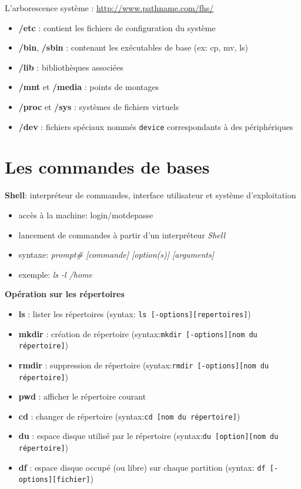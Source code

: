 \documentclass[french]{beamer}
\begin{document}
 \begin{frame}
 L'arborescence système : \url{http://www.pathname.com/fhs/}
	\begin{itemize}
	\item \textbf{/etc} : contient les fichiers de configuration du système
	\item \textbf{/bin}, \textbf{/sbin} : contenant les exécutables de base (ex: cp, mv, ls)
    \item \textbf{/lib} : bibliothèques associées 
    \item \textbf{/mnt} et \textbf{/media} : points de montages       
    \item \textbf{/proc} et \textbf{/sys} : systèmes de fichiers virtuels
    \item \textbf{/dev} : fichiers spéciaux nommés \texttt{device} correspondants à des périphériques
    \end{itemize}
\end{frame}


\section{Les commandes de bases} 
\frame{\tableofcontents[current]}

\begin{frame}
\textbf{Shell}: interpréteur de commandes, interface utilisateur et système
d'exploitation
    \begin{itemize}
    \item accès à la machine: login/motdepasse 
    \item lancement de commandes à partir d'un interpréteur \textit{Shell}
    \item syntaxe: \textit{prompt\# [commande] [option(s)] [arguments]}
    \item exemple: \textit{ls -l /home}
    \end{itemize}
\end{frame}

\begin{frame}
\textbf{Opération sur les répertoires}
    \begin{itemize}
    \item \textbf{ls} : lister les répertoires (syntax: \texttt{ls [-options][repertoires]})
    \item \textbf{mkdir} : création de répertoire (syntax:\texttt{mkdir [-options][nom du répertoire]})
    \item \textbf{rmdir} : suppression de répertoire (syntax:\texttt{rmdir [-options][nom du répertoire]})
    \item \textbf{pwd} : afficher le répertoire courant
    \item \textbf{cd} : changer de répertoire (syntax:\texttt{cd [nom du répertoire]})
    \item \textbf{du} : espace disque utilisé par le répertoire (syntax:\texttt{du [option][nom du répertoire]})
    \item \textbf{df} : espace disque occupé (ou libre) sur chaque partition (syntax: \texttt{df [-options][fichier]})
    \end{itemize}
\end{frame}
\end{document}
